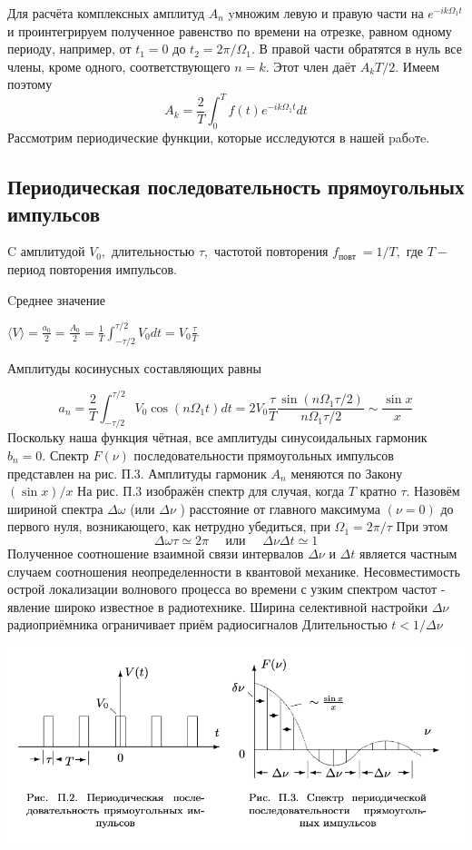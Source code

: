 \documentclass[a4paper, 12pt]{article}%
\begin{document}
Для расчёта комплексных амплитуд $A_{n}$ yмножим левую и правую части на $e^{-i k \Omega_{1} t}$ и проинтегрируем полученное равенство по времени на отрезке, равном одному периоду, например, от $t_{1}=0$ до $t_{2}=2 \pi / \Omega_{1} .$ В правой части обратятся в нуль все члены, кроме одного, соответствующего $n=k .$ Этот член даёт $A_{k} T / 2 .$ Имеем поэтому
$$
A_{k}=\frac{2}{T} \int_{0}^{T} f(t) e^{-i k \Omega_{1} t} d t
$$
Рассмотрим периодические функции, которые исследуются в нашей paбoтe.


\subsection{Периодическая последовательность прямоугольных импульсов}
C амплитудой $V_{0},$ длительностью $\tau,$ частотой повторения $f_{\text {повт }}=1 / T,$ где $T-$ период повторения импульсов.


Cреднее значение

$\langle V\rangle=\frac{a_{0}}{2}=\frac{A_{0}}{2}=\frac{1}{T} \int_{-\tau / 2}^{\tau / 2} V_{0} d t=V_{0} \frac{\tau}{T}$

Амплитуды косинусных составляющих равны

$$
a_{n}=\frac{2}{T} \int_{-\tau / 2}^{\tau / 2} V_{0} \cos \left(n \Omega_{1} t\right) d t=2 V_{0} \frac{\tau}{T} \frac{\sin \left(n \Omega_{1} \tau / 2\right)}{n \Omega_{1} \tau / 2} \sim \frac{\sin x}{x}
$$
Поскольку наша функция чётная, все амплитуды синусоидальных гармоник $b_{n}=0 .$ Спектр $F(\nu)$ последовательности прямоугольных импульсов представлен на рис. П.3. Амплитуды гармоник $A_{n}$ меняются по Закону $(\sin x) / x$
На рис. П.3 изображён спектр для случая, когда $T$ кратно $\tau .$ Назовём шириной спектра $\Delta \omega$ (или $\Delta \nu$ ) расстояние от главного максимума $(\nu=0)$ до первого нуля, возникающего, как нетрудно убедиться, при $\Omega_{1}=2 \pi / \tau$ При этом
$$
\Delta \omega \tau \simeq 2 \pi \quad \text { или } \quad \Delta \nu \Delta t \simeq 1
$$
Полученное соотношение взаимной связи интервалов $\Delta \nu$ и $\Delta t$ является
частным случаем соотношения неопределенности в квантовой механике. Несовместимость острой локализации волнового процесса во времени с узким спектром частот - явление широко известное в радиотехнике. Ширина селективной настройки $\Delta \nu$ радиоприёмника ограничивает приём радиосигналов Длительностью $t<1 / \Delta \nu$

 \begin{center}
\includegraphics[width=0.7\linewidth]{./anat/2.jpg}\\
\end{center}
\end{document}
